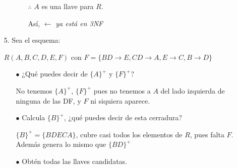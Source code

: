 \documentclass[12pt, letterpaper]{article}
\begin{document}
\begin{itemize}
\begin{itemize}
\begin{itemize}
                                    $\therefore$ $A$ es una llave para $R$. \vspace{.3cm}

                                    Así,  $\leftarrow$ \textit{ya está en 3NF}
                         
                    \end{itemize}
                 
            \end{itemize} \vspace{.3cm}
           
        \item[5.]   Sea el esquema:\vspace{.2cm}
         
                    $R(A,B,C,D,E,F)$ con $F = \{BD \rightarrow E,
                     CD \rightarrow A, E \rightarrow C, B\rightarrow D\}$
                
                \begin{itemize}

                    \item[$\bullet$]    ¿Qué puedes decir de $\{A\}^+$ y $\{F\}^+$? \vspace{.1cm}
                    
                                        No tenemos $\{A\}^+$, $\{F\}^+$ pues no tenemos a $A$ del
                                        lado izquierda de ninguna de las DF, y $F$ ni siquiera aparece.\vspace{.2cm}

                    \item[$\bullet$]    Calcula $\{B\}^+$, ¿qué puedes decir de 
                                        esta cerradura? \vspace{.1cm}
                                        
                                        $\{B\}^+=\{BDECA\}$, cubre casi todos los elementos de $R$, pues falta $F$. Además genera lo mismo que $\{BD\}^+$ \vspace{.2cm}

                    \item[$\bullet$]    Obtén todas las llaves candidatas.
                    

\end{itemize}
\end{itemize}
\end{document}
